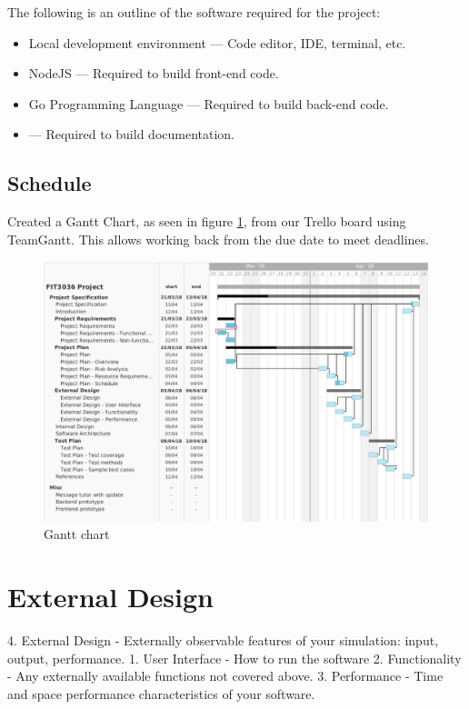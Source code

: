 \documentclass[a4paper,11pt]{article}
\begin{document}
The following is an outline of the software required for the project:

\begin{itemize}
  \item Local development environment --- Code editor, IDE, terminal, etc.
  \item NodeJS --- Required to build front-end code.
  \item Go Programming Language --- Required to build back-end code.
  \item \LaTex{} --- Required to build documentation.
\end{itemize}

\subsection{Schedule}


Created a Gantt Chart, as seen in figure \ref{fig:gantt}, from our Trello board using TeamGantt. This allows working back from the due date to meet deadlines.

\begin{figure}[H]
\includegraphics[width=\textwidth]{gantt-chart}
\caption{Gantt chart}
    \label{fig:gantt}
\end{figure}


\section{External Design}


4. External Design - Externally observable features of your simulation: input, output, performance.
  1. User Interface - How to run the software
  2. Functionality - Any externally available functions not covered above.
  3. Performance - Time and space performance characteristics of your software.
\end{document}
